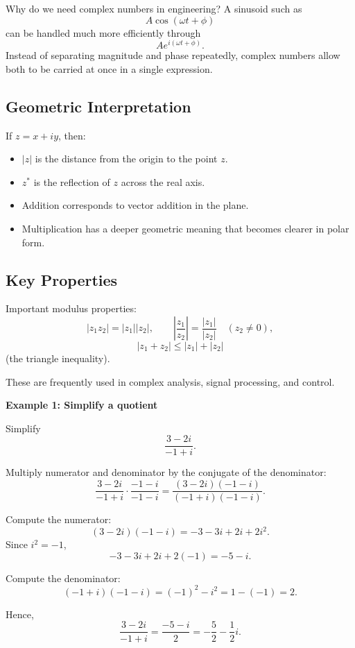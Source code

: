 Why do we need complex numbers in engineering? A sinusoid such as
\[
    A\cos(\omega t+\phi)
\]
can be handled much more efficiently through
\[
    Ae^{i(\omega t+\phi)}.
\]
Instead of separating magnitude and phase repeatedly, complex numbers allow both to be carried at once in a single expression.

\subsection*{Geometric Interpretation}

If $z=x+iy$, then:

\begin{itemize}
    \item $|z|$ is the distance from the origin to the point $z$.
    \item $z^*$ is the reflection of $z$ across the real axis.
    \item Addition corresponds to vector addition in the plane.
    \item Multiplication has a deeper geometric meaning that becomes clearer in polar form.
\end{itemize}

\subsection*{Key Properties}

\begin{conceptbox}
    Important modulus properties:
    \[
        |z_1z_2|=|z_1||z_2|,
        \qquad
        \left|\frac{z_1}{z_2}\right|=\frac{|z_1|}{|z_2|} \quad (z_2\neq 0),
    \]
    \[
        |z_1+z_2|\le |z_1|+|z_2|
    \]
    (the triangle inequality).
\end{conceptbox}

These are frequently used in complex analysis, signal processing, and control.

\begin{examplebox}
    \textbf{Example 1: Simplify a quotient}

    Simplify
    \[
        \frac{3-2i}{-1+i}.
    \]

    Multiply numerator and denominator by the conjugate of the denominator:
    \[
        \frac{3-2i}{-1+i}\cdot \frac{-1-i}{-1-i}
        =
        \frac{(3-2i)(-1-i)}{(-1+i)(-1-i)}.
    \]

    Compute the numerator:
    \[
        (3-2i)(-1-i)= -3-3i+2i+2i^2.
    \]
    Since $i^2=-1$,
    \[
        -3-3i+2i+2(-1) = -5-i.
    \]

    Compute the denominator:
    \[
        (-1+i)(-1-i)=(-1)^2-i^2 = 1-(-1)=2.
    \]

    Hence,
    \[
        \frac{3-2i}{-1+i}=\frac{-5-i}{2}=-\frac{5}{2}-\frac{1}{2}i.
    \]
\end{examplebox}

